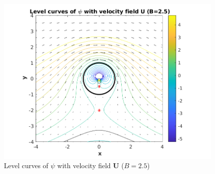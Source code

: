 \documentclass{article}
\def\*#1{\mathbf{#1}}
\begin{document}
\begin{figure}
    \includegraphics[width=\textwidth]{fig2}
    \centering
    \caption{Level curves of $\psi$ with velocity field $\*U$ ($B = 2.5$)}
    \label{figure:b-high}
\end{figure}
\end{document}
